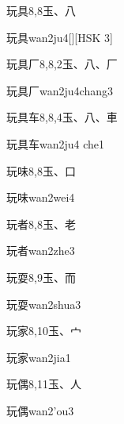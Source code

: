 \begin{entry}{玩具}{8,8}{⽟、⼋}
  \begin{phonetics}{玩具}{wan2ju4}[][HSK 3]
  \end{phonetics}
\end{entry}

\begin{entry}{玩具厂}{8,8,2}{⽟、⼋、⼚}
  \begin{phonetics}{玩具厂}{wan2ju4chang3}
  \end{phonetics}
\end{entry}

\begin{entry}{玩具车}{8,8,4}{⽟、⼋、⾞}
  \begin{phonetics}{玩具车}{wan2ju4 che1}
  \end{phonetics}
\end{entry}

\begin{entry}{玩味}{8,8}{⽟、⼝}
  \begin{phonetics}{玩味}{wan2wei4}
  \end{phonetics}
\end{entry}

\begin{entry}{玩者}{8,8}{⽟、⽼}
  \begin{phonetics}{玩者}{wan2zhe3}
  \end{phonetics}
\end{entry}

\begin{entry}{玩耍}{8,9}{⽟、⽽}
  \begin{phonetics}{玩耍}{wan2shua3}
  \end{phonetics}
\end{entry}

\begin{entry}{玩家}{8,10}{⽟、⼧}
  \begin{phonetics}{玩家}{wan2jia1}
  \end{phonetics}
\end{entry}

\begin{entry}{玩偶}{8,11}{⽟、⼈}
  \begin{phonetics}{玩偶}{wan2'ou3}
  \end{phonetics}
\end{entry}

